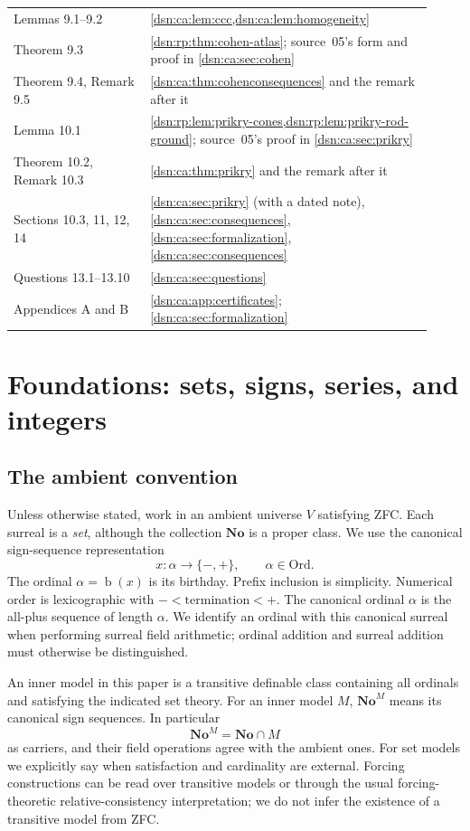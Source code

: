 \documentclass[11pt,a4paper]{article}
\numberwithin{equation}{section}
\theoremstyle{definition}
\theoremstyle{remark}
\newcommand{\No}{\mathbf{No}}
\newcommand{\Ord}{\mathrm{Ord}}
\newcommand{\bd}{\operatorname{b}}
\begin{document}
{\begin{longtable}{@{}P{0.30\linewidth}P{0.62\linewidth}@{}}
Lemmas 9.1--9.2 & \cref{dsn:ca:lem:ccc,dsn:ca:lem:homogeneity}\\
Theorem 9.3 & \cref{dsn:rp:thm:cohen-atlas}; source~05's form and proof in \cref{dsn:ca:sec:cohen}\\
Theorem 9.4, Remark 9.5 & \cref{dsn:ca:thm:cohenconsequences} and the remark after it\\
Lemma 10.1 & \cref{dsn:rp:lem:prikry-cones,dsn:rp:lem:prikry-rod-ground}; source~05's proof in \cref{dsn:ca:sec:prikry}\\
Theorem 10.2, Remark 10.3 & \cref{dsn:ca:thm:prikry} and the remark after it\\
Sections 10.3, 11, 12, 14 & \cref{dsn:ca:sec:prikry} (with a dated note), \cref{dsn:ca:sec:consequences}, \cref{dsn:ca:sec:formalization}, \cref{dsn:ca:sec:consequences}\\
Questions 13.1--13.10 & \cref{dsn:ca:sec:questions}\\
Appendices A and B & \cref{dsn:ca:app:certificates}; \cref{dsn:ca:sec:formalization}\\
\bottomrule
\end{longtable}}

\section{Foundations: sets, signs, series, and integers}
\label{dsn:rp:sec:foundations}

\subsection{The ambient convention}

Unless otherwise stated, work in an ambient universe $V$ satisfying ZFC.
Each surreal is a \emph{set}, although the collection $\No$ is a proper
class. We use the canonical sign-sequence representation
\[
 x:\alpha\longrightarrow\{-,+\},\qquad \alpha\in\Ord.
\]
The ordinal $\alpha=\bd(x)$ is its birthday. Prefix inclusion is
simplicity. Numerical order is lexicographic with
$-<\text{termination}<+$. The canonical ordinal $\alpha$ is the all-plus
sequence of length $\alpha$. We identify an ordinal with this canonical
surreal when performing surreal field arithmetic; ordinal addition and
surreal addition must otherwise be distinguished.

An inner model in this paper is a transitive definable class containing
all ordinals and satisfying the indicated set theory. For an inner model
$M$, $\No^M$ means its canonical sign sequences. In particular
\[
 \No^M=\No\cap M
\]
as carriers, and their field operations agree with the ambient ones.
For set models we explicitly say when satisfaction and cardinality are
external. Forcing constructions can be read over transitive models or
through the usual forcing-theoretic relative-consistency interpretation;
we do not infer the existence of a transitive model from ZFC.
\end{document}
